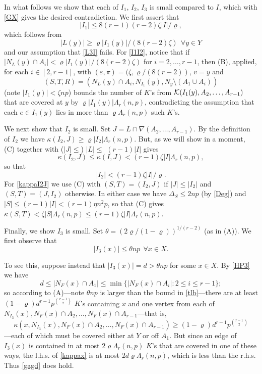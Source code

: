 \documentclass[letterpaper,11pt]{article}
\newcommand{\beq}[1]{\begin{equation}\label{#1}}
\newcommand{\enq}[0]{\end{equation}}
\newcommand{\mn}[0]{\medskip\noindent}
\newcommand{\sm}[0]{\setminus}
\renewcommand{\dots}[0]{,\ldots,}
\newcommand{\K}[0]{{\cal K}}
\newcommand{\0}[0]{\emptyset}
\newcommand{\C}[2]{{{#1}\choose{{#2}}}}
\newcommand{\gD}[0]{\Delta }
\newcommand{\gL}[0]{\Lambda}
\newcommand{\gz}[0]{\zeta}
\newcommand{\eps}[0]{\varepsilon }
\newcommand{\vr}[0]{\varrho}
\newcommand{\glr}[0]{\gL_r(n,p)}
\begin{document}
In what follows we show that each of $I_1$, $I_2$, $I_3$ is
small compared to $I$, which with \eqref{GX} gives
the desired contradiction.
%
We first assert that
\beq{I1I}
|I_1| \leq 8(r-1)(r-2)\gz |I|/\vr,
\enq
which follows from
\beq{I1I2}
|L(y)| \geq \vr |I_1(y)|/(8(r-2)\gz) ~~\forall y\in Y
\enq
and our assumption that \eqref{L3I} fails.
%
For \eqref{I1I2}, notice that
if $|N_L(y)\cap A_i|< \vr |I_1(y)|/(8(r-2)\gz)$
for $i=2\dots r-1$, then (B),
applied, for each $i\in [2,r-1]$,
with $(\eps,\pi)=(\gz,\vr/(8(r-2))$, $v=y$
and
\[(S,T,R) = ( N_L(y)\cap A_i,N_{I_1}(y),N_y\sm (A_1\cup A_i))\]
(note $|I_1(y)|<\gz np$)
bounds
the number of $K$'s from $\K(I_1(y),A_2\dots A_{r-1})$
that are covered at $y$ by $\vr |I_1(y)|\glr $,
contradicting the assumption that each $e\in I_1(y)$ lies in more than
$\vr \glr $ such $K$'s.
%



\medskip
We next show that $I_2$ is small.
Set $J=L\cap \nabla(A_2\dots A_{r-1})$.
By the definition of $I_2$ we have
$\kappa(I_2,J) \geq \vr |I_2|\glr $.
But, as we will show in a moment, (C) together with
($|J|\leq $) $|L|\leq$ $(r-1)|I|$ gives
\beq{kappaI2J}
\kappa(I_2,J) \leq \kappa(I,J)< (r-1)\gz|I|\glr ,
\enq
so that \beq{I2I}
|I_2|< (r-1)\gz|I|/\vr.
\enq
For \eqref{kappaI2J} we use (C) with
$(S,T)=(I_2,J)$ if $|J|\leq |I_2|$ and
$(S,T)=(J,I_2)$ otherwise.
In either case we have $\gD_S\leq 2np$ (by \eqref{Deg}) and
$|S|\leq (r-1)|I| < (r-1)\eta n^2p$,
so that (C) gives
$\kappa(S,T) < \gz |S|\glr  \leq (r-1)\gz|I|\glr $.


\medskip
Finally, we show $I_3$ is small. Set
$\theta=(2\vr/(1-\vr))^{1/(r-2)}$ (as in (A)).
We first observe that
\beq{gagd}
|I_3(x)| \leq \theta np ~~\forall x\in X.
\enq

\mn
To see this, suppose instead that
$|I_3(x)| =d > \theta np$
for some $x\in X$.
By \eqref{HP3} we have
\[
d\leq |N_F(x)\cap A_1|\leq \min\{|N_F(x)\cap A_i|:2\leq i\leq r-1\};
\]
so according to (A)---note $\theta np$ is larger than
the bound in \eqref{tlb}---there are at least
$(1-\vr)d^{r-1}p^{\C{r-1}{2}}$
$K$'s containing $x$ and one vertex from each of $N_{I_3}(x),
N_F(x)\cap A_2\dots N_F(x)\cap A_{r-1}$---that is,
\beq{kappax}
\kappa(x,N_{I_3}(x),
N_F(x)\cap A_2\dots N_F(x)\cap A_{r-1})\geq
(1-\vr)d^{r-1}p^{\C{r-1}{2}}
\enq
---each of which must be covered either at $Y$ or off $A_1$.
But since an edge of $I_3(x)$
is contained in at most $2\vr \glr $ $K$'s that are covered
in one of these ways, the l.h.s. of \eqref{kappax} is
at most $2d\vr \glr $, which is less than the r.h.s.
Thus \eqref{gagd} does hold.
\end{document}
